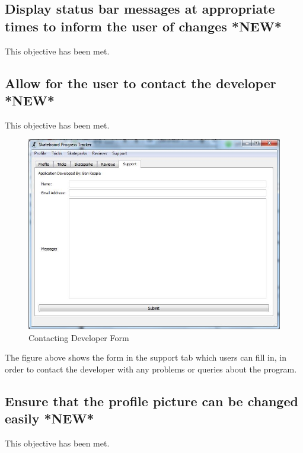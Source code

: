 \subsection {Display status bar messages at appropriate times to inform the user of changes *NEW*} %

This objective has been met.



\subsection {Allow for the user to contact the developer *NEW*}

This objective has been met.


\begin{figure}[H]
    \includegraphics[width=\textwidth]{./Evaluation/images/Contactsupport.jpg}
    \caption{Contacting Developer Form} \label{fig:ContactSupportEVD}
\end{figure}

The figure above shows the form in the support tab which users can fill in, in order to contact the developer with any problems or queries about the program.



\subsection {Ensure that the profile picture can be changed easily *NEW*} %

This objective has been met.



